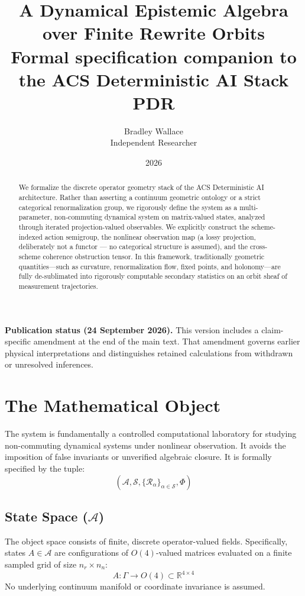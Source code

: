 \documentclass[11pt,a4paper]{article}
\title{\textbf{A Dynamical Epistemic Algebra over Finite Rewrite Orbits}\\
\large Formal specification companion to the ACS Deterministic AI Stack PDR}
\author{Bradley Wallace\\ \small Independent Researcher}
\date{2026}
\begin{document}
\maketitle

\begin{abstract}
We formalize the discrete operator geometry stack of the ACS Deterministic AI architecture. Rather than asserting a continuum geometric ontology or a strict categorical renormalization group, we rigorously define the system as a multi-parameter, non-commuting dynamical system on matrix-valued states, analyzed through iterated projection-valued observables. We explicitly construct the scheme-indexed action semigroup, the nonlinear observation map (a lossy projection, deliberately not a functor --- no categorical structure is assumed), and the cross-scheme coherence obstruction tensor. In this framework, traditionally geometric quantities---such as curvature, renormalization flow, fixed points, and holonomy---are fully de-sublimated into rigorously computable secondary statistics on an orbit sheaf of measurement trajectories.
\end{abstract}
\par\smallskip\noindent\textbf{Publication status (24 September 2026).}
This version includes a claim-specific amendment at the end of the main text.
That amendment governs earlier physical interpretations and distinguishes
retained calculations from withdrawn or unresolved inferences.\par\smallskip


\section{The Mathematical Object}

The system is fundamentally a controlled computational laboratory for studying non-commuting dynamical systems under nonlinear observation. It avoids the imposition of false invariants or unverified algebraic closure. It is formally specified by the tuple:
\begin{equation}
    \left( \mathcal{A}, \mathcal{S}, \{\mathcal{R}_\alpha\}_{\alpha \in \mathcal{S}}, \Phi \right)
\end{equation}

\subsection{State Space ($\mathcal{A}$)}
The object space consists of finite, discrete operator-valued fields. Specifically, states $A \in \mathcal{A}$ are configurations of $O(4)$-valued matrices evaluated on a finite sampled grid of size $n_r \times n_n$:
\begin{equation}
    A : \Gamma \to O(4) \subset \mathbb{R}^{4 \times 4}
\end{equation}
No underlying continuum manifold or coordinate invariance is assumed.
\end{document}
